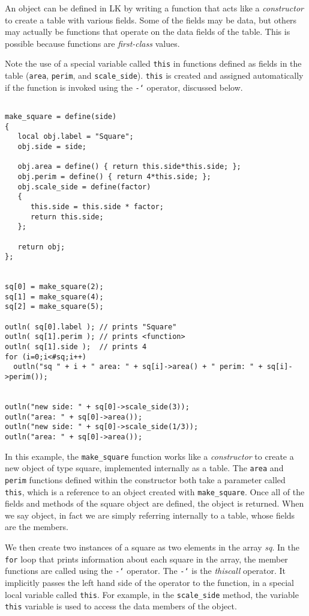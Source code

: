 \documentclass{article}
\newcommand\gt{\char`\>}
\begin{document}
An object can be defined in LK by writing a function that acts like a \emph{constructor} to create a table with various fields.  Some of the fields may be data, but others may actually be functions that operate on the data fields of the table.  This is possible because functions are \emph{first-class} values.

Note the use of a special variable called \texttt{this} in functions defined as fields in the table (\texttt{area}, \texttt{perim}, and \texttt{scale\_side}).  \texttt{this} is created and assigned automatically if the function is invoked using the \texttt{-\gt} operator, discussed below.

\begin{verbatim}

make_square = define(side)
{
   local obj.label = "Square";
   obj.side = side;

   obj.area = define() { return this.side*this.side; };  
   obj.perim = define() { return 4*this.side; };
   obj.scale_side = define(factor)
   {
      this.side = this.side * factor;
      return this.side;
   };
   
   return obj;
};


sq[0] = make_square(2);
sq[1] = make_square(4);
sq[2] = make_square(5);

outln( sq[0].label ); // prints "Square"
outln( sq[1].perim ); // prints <function>
outln( sq[1].side );  // prints 4
for (i=0;i<#sq;i++)
  outln("sq " + i + " area: " + sq[i]->area() + " perim: " + sq[i]->perim());


outln("new side: " + sq[0]->scale_side(3));
outln("area: " + sq[0]->area());
outln("new side: " + sq[0]->scale_side(1/3));
outln("area: " + sq[0]->area());
\end{verbatim}

In this example, the \texttt{make\_square} function works like a \emph{constructor} to create a new object of type square, implemented internally as a table.  The \texttt{area} and \texttt{perim} functions defined within the constructor both take a parameter called \texttt{this}, which is a reference to an object created with \texttt{make\_square}.  Once all of the fields and methods of the square object are defined, the object is returned.  When we say object, in fact we are simply referring internally to a table, whose fields are the members.

We then create two instances of a square as two elements in the array \emph{sq}.  In the \texttt{for} loop that prints information about each square in the array, the member functions are called using the \texttt{-\gt} operator.  The \texttt{-\gt} is the \emph{thiscall} operator.  It implicitly passes the left hand side of the operator to the function, in a special local variable called \texttt{this}.  For example, in the \texttt{scale\_side} method, the variable \texttt{this} variable is used to access the data members of the object.
\end{document}

